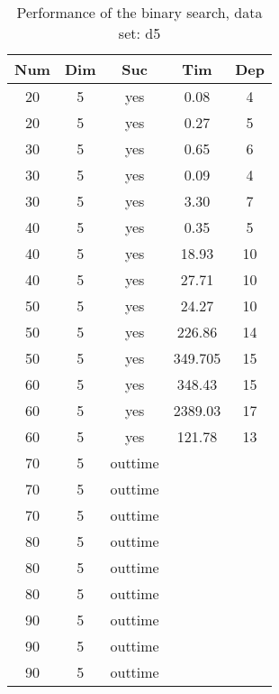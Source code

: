 \begin{table}[!htb]
  \centering
  \begin{tabular}[center]{|c|c|c|c|c|}
    \hline
    Num & Dim & Suc & Tim & Dep \\
    \hline
    20 & 5 & yes & 0.08 & 4 \\
    20 & 5 & yes & 0.27 & 5 \\
    30 & 5 & yes & 0.65 & 6 \\
    30 & 5 & yes & 0.09 & 4 \\
    30 & 5 & yes & 3.30 & 7 \\
    40 & 5 & yes & 0.35 & 5 \\
    40 & 5 & yes & 18.93 & 10 \\
    40 & 5 & yes & 27.71 & 10 \\
    50 & 5 & yes & 24.27 & 10 \\
    50 & 5 & yes & 226.86 & 14 \\
    50 & 5 & yes & 349.705 & 15 \\
    60 & 5 & yes & 348.43 & 15 \\
    60 & 5 & yes & 2389.03 & 17 \\
    60 & 5 & yes & 121.78 & 13 \\
    70 & 5 & outtime &&\\
    70 & 5 & outtime &&\\
    70 & 5 & outtime &&\\
    80 & 5 & outtime &&\\
    80 & 5 & outtime &&\\
    80 & 5 & outtime &&\\
    90 & 5 & outtime &&\\
    90 & 5 & outtime &&\\
    90 & 5 & outtime &&\\
    \hline
  \end{tabular}
  \caption{Performance of the binary search, data set: d5}
  \label{tab:test.bin-d5}
\end{table}

